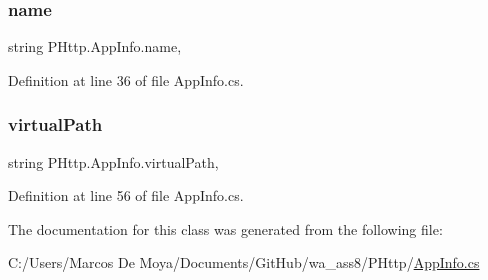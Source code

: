 \mbox{\label{class_p_http_1_1_app_info_a2d2a1695a1ebcee1c6d045f291c127c8}} 
\subsubsection{\texorpdfstring{name}{name}}
{\footnotesize\ttfamily string P\+Http.\+App\+Info.\+name\hspace{0.3cm}{\ttfamily [get]}, {\ttfamily [set]}}



Definition at line 36 of file App\+Info.\+cs.

\mbox{\label{class_p_http_1_1_app_info_a4432977962617879b03ff44ea66e55fa}} 
\subsubsection{\texorpdfstring{virtual\+Path}{virtualPath}}
{\footnotesize\ttfamily string P\+Http.\+App\+Info.\+virtual\+Path\hspace{0.3cm}{\ttfamily [get]}, {\ttfamily [set]}}



Definition at line 56 of file App\+Info.\+cs.



The documentation for this class was generated from the following file\+:\begin{DoxyCompactItemize}
\item 
C\+:/\+Users/\+Marcos De Moya/\+Documents/\+Git\+Hub/wa\+\_\+ass8/\+P\+Http/\hyperlink{_app_info_8cs}{App\+Info.\+cs}\end{DoxyCompactItemize}
